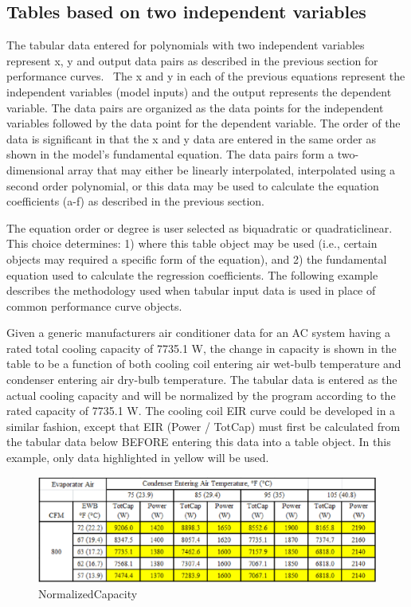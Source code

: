 \subsection{Tables based on two independent variables}\label{tables-based-on-two-independent-variables}

The tabular data entered for polynomials with two independent variables represent x, y and output data pairs as described in the previous section for performance curves.~ The x and y in each of the previous equations represent the independent variables (model inputs) and the output represents the dependent variable. The data pairs are organized as the data points for the independent variables followed by the data point for the dependent variable. The order of the data is significant in that the x and y data are entered in the same order as shown in the model's fundamental equation. The data pairs form a two-dimensional array that may either be linearly interpolated, interpolated using a second order polynomial, or this data may be used to calculate the equation coefficients (a-f) as described in the previous section.

The equation order or degree is user selected as biquadratic or quadraticlinear. This choice determines: 1) where this table object may be used (i.e., certain objects may required a specific form of the equation), and 2) the fundamental equation used to calculate the regression coefficients. The following example describes the methodology used when tabular input data is used in place of common performance curve objects.

Given a generic manufacturers air conditioner data for an AC system having a rated total cooling capacity of 7735.1 W, the change in capacity is shown in the table to be a function of both cooling coil entering air wet-bulb temperature and condenser entering air dry-bulb temperature. The tabular data is entered as the actual cooling capacity and will be normalized by the program according to the rated capacity of 7735.1 W. The cooling coil EIR curve could be developed in a similar fashion, except that EIR (Power / TotCap) must first be calculated from the tabular data below BEFORE entering this data into a table object. In this example, only data highlighted in yellow will be used.

\begin{figure}[htbp]
\centering
\includegraphics{media/image7871.png}
\caption{NormalizedCapacity}
\end{figure}

